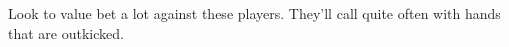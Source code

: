 Look to value bet a lot against these players. They'll call quite often
with hands that are outkicked.






